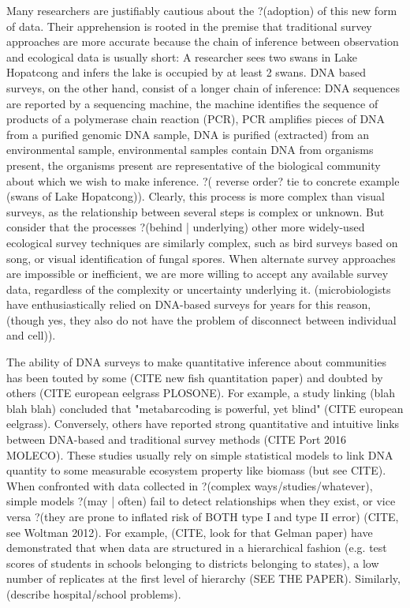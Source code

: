\documentclass[11pt,letterpaper]{article} %
\begin{document}
Many researchers are justifiably cautious about the ?(adoption) of this new form of data.
Their apprehension is rooted in the premise that traditional survey approaches are more accurate because the chain of inference between observation and ecological data is usually short: A researcher sees two swans in Lake Hopatcong and infers the lake is occupied by at least 2 swans.
DNA based surveys, on the other hand, consist of a longer chain of inference:
DNA sequences are reported by a sequencing machine, the machine identifies the sequence of products of a polymerase chain reaction (PCR), PCR amplifies pieces of DNA from a purified genomic DNA sample, DNA is purified (extracted) from an environmental sample, environmental samples contain DNA from organisms present, the organisms present are representative of the biological community about which we wish to make inference. ?( reverse order? tie to concrete example (swans of Lake Hopatcong)).
Clearly, this process is more complex than visual surveys, as the relationship between several steps is complex or unknown.
But consider that the processes ?(behind | underlying) other more widely-used ecological survey techniques are similarly complex, such as bird surveys based on song, or visual identification of fungal spores. When alternate survey approaches are impossible or inefficient, we are more willing to accept any available survey data, regardless of the complexity or uncertainty underlying it. (microbiologists have enthusiastically relied on DNA-based surveys for years for this reason, (though yes, they also do not have the problem of disconnect between individual and cell)).

The ability of DNA surveys to make quantitative inference about communities has been touted by some (CITE new fish quantitation paper) and doubted by others (CITE european eelgrass PLOSONE).
For example, a study linking (blah blah blah) concluded that "metabarcoding is powerful, yet blind" (CITE european eelgrass).
Conversely, others have reported strong quantitative and intuitive links between DNA-based and traditional survey methods (CITE Port 2016 MOLECO).
These studies usually rely on simple statistical models to link DNA quantity to some measurable ecosystem property like biomass (but see CITE).
When confronted with data collected in ?(complex ways/studies/whatever), simple models ?(may | often) fail to detect relationships when they exist, or vice versa ?(they are prone to inflated risk of BOTH type I and type II error) (CITE, see Woltman 2012).
For example, (CITE, look for that Gelman paper) have demonstrated that when data are structured in a hierarchical fashion (e.g. test scores of students in schools belonging to districts belonging to states), a low number of replicates at the first level of hierarchy (SEE THE PAPER).
Similarly, (describe hospital/school problems).
\end{document}
